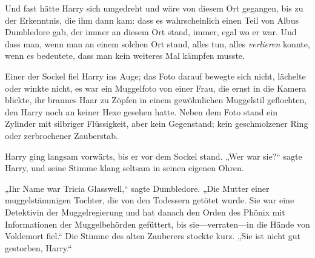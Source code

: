 Und fast hätte Harry sich umgedreht und wäre von diesem Ort gegangen, bis zu der Erkenntnis, die ihm dann kam: dass es wahrscheinlich einen Teil von Albus Dumbledore gab, der immer an diesem Ort stand, immer, egal wo er war. Und dass man, wenn man an einem solchen Ort stand, alles tun, alles \emph{verlieren} konnte, wenn es bedeutete, dass man kein weiteres Mal kämpfen musste.

Einer der Sockel fiel Harry ins Auge; das Foto darauf bewegte sich nicht, lächelte oder winkte nicht, es war ein Muggelfoto von einer Frau, die ernst in die Kamera blickte, ihr braunes Haar zu Zöpfen in einem gewöhnlichen Muggelstil geflochten, den Harry noch an keiner Hexe gesehen hatte. Neben dem Foto stand ein Zylinder mit silbriger Flüssigkeit, aber kein Gegenstand; kein geschmolzener Ring oder zerbrochener Zauberstab.

Harry ging langsam vorwärts, bis er vor dem Sockel stand. „Wer war sie?“ sagte Harry, und seine Stimme klang seltsam in seinen eigenen Ohren.

„Ihr Name war Tricia Glasswell,“ sagte Dumbledore. „Die Mutter einer muggelstämmigen Tochter, die von den Todessern getötet wurde. Sie war eine Detektivin der Muggelregierung und hat danach den Orden des Phönix mit Informationen der Muggelbehörden gefüttert, bis sie—verraten—in die Hände von Voldemort fiel.“ Die Stimme des alten Zauberers stockte kurz. „Sie ist nicht gut gestorben, Harry.“

